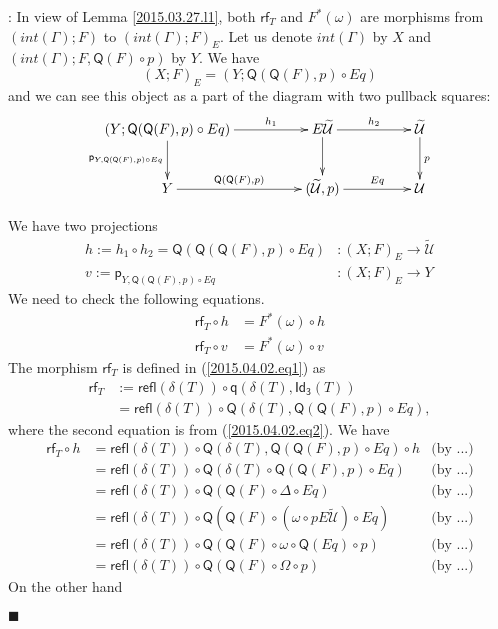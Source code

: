 \documentclass[12pt]{article}
\numberwithin{equation}{section}
\newenvironment{myproof}{{\bf Proof}:}{$\blacksquare$ \vskip 5mm }
\newcommand{\by}[1]{\text{(by #1)}}
\newcommand{\sr}{\rightarrow}
\newcommand{\wt}{\widetilde}
\newcommand{\p}{\mathsf{p}}
\newcommand{\q}{\mathsf{q}}
\newcommand{\Idx}{\mathsf{Id_3}} %
\newcommand{\refl}{\mathsf{refl}}
\newcommand{\U}{\mathcal{U}}
\newcommand{\rf}{\mathsf{rf}}
\newcommand{\Q}{\mathsf{Q}}
\begin{document}
\begin{myproof}
In view of Lemma \ref{2015.03.27.l1}, both $\rf_T$ and $F^*(\omega)$ are
morphisms from $(int(\Gamma);F)$ to $(int(\Gamma);F)_{E}$. Let us denote
$int(\Gamma)$ by $X$ and $(int(\Gamma);F,\Q(F)\circ p)$ by $Y$. We have
%
$$(X;F)_{E}=(Y;\Q(\Q(F),p)\circ Eq)$$
%
and we can see this object as a part of the diagram with two pullback squares:
%
$$
\begin{xy}
          \xymatrix@C=4pc{ (Y;\Q(\Q(F),p)\circ Eq) \ar[r]^-{h_1} \ar[d]_{\p_{Y,
                \Q(\Q(F),p)\circ Eq}} & E\wt{\U} \ar[r]^-{h_2} \ar[d] & \wt{\U}
            \ar[d]^{p} \\ Y \ar[r]^-{\Q(\Q(F),p)} & (\wt{\U},p) \ar[r]^-{Eq} & \U }
\end{xy}
$$

%
We have two projections
%
\begin{align*}
  h := h_1\circ h_2=\Q(\Q(\Q(F),p)\circ Eq)&:(X;F)_{E}\sr \wt{\U} \\
  v := \p_{Y,\Q(\Q(F),p)\circ Eq}&:(X;F)_{E} \sr Y
\end{align*}
%
We need to check the following equations.
%
\begin{align*}
  \rf_T\circ h &=F^*(\omega)\circ h \\
  \rf_T\circ v &=F^*(\omega)\circ v
\end{align*}
%
The morphism $\rf_T$ is defined in (\ref{2015.04.02.eq1}) as
%
\begin{align*}
  \rf_T
  & :=\refl(\delta(T))\circ \q(\delta(T),\Idx(T)) \\
  & = \refl(\delta(T))\circ \Q(\delta(T),\Q(\Q(F),p)\circ Eq),
\end{align*}
%
where the second equation is from (\ref{2015.04.02.eq2}).
%
We have
%
\begin{align*}
  \rf_T \circ h
  & = \refl(\delta(T))\circ \Q(\delta(T),\Q(\Q(F),p)\circ Eq)\circ h & \by{...}\\
  & = \refl(\delta(T))\circ \Q(\delta(T)\circ \Q(\Q(F),p)\circ Eq) & \by{...}\\
  & = \refl(\delta(T))\circ \Q(\Q(F)\circ \Delta\circ Eq) & \by{...}\\
  & = \refl(\delta(T))\circ \Q(\Q(F)\circ (\omega\circ pE\wt{\U})\circ Eq) & \by{...}\\
  & = \refl(\delta(T))\circ \Q(\Q(F)\circ \omega\circ \Q(Eq)\circ p) & \by{...}\\
  & = \refl(\delta(T))\circ \Q(\Q(F)\circ \Omega\circ p) & \by{...}
\end{align*}
%
On the other hand

\end{myproof}
\end{document}

